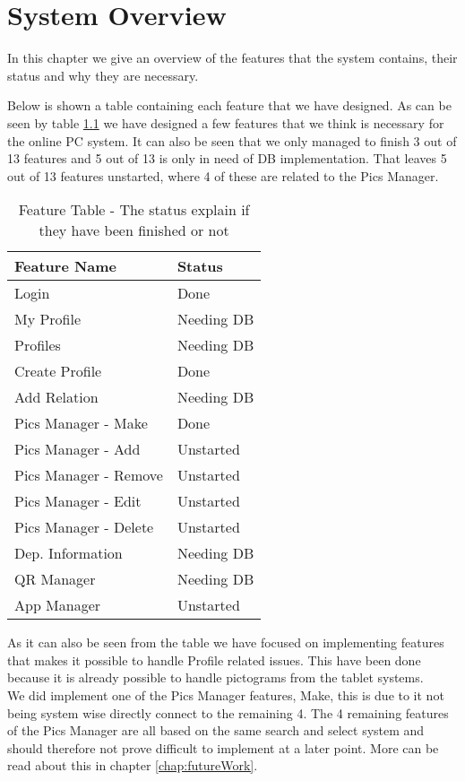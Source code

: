 \chapter{System Overview}
\label{chap:systemOverview}
In this chapter we give an overview of the features that the system contains, their status and why they are necessary.

Below is shown a table containing each feature that we have designed. As can be seen by table \ref{tab:FeatureTable} we have designed a few features that we think is necessary for the online PC system. It can also be seen that we only managed to finish 3 out of 13 features and 5 out of 13 is only in need of DB implementation. That leaves 5 out of 13 features unstarted, where 4 of these are related to the Pics Manager.

\begin{table}[htbp]
	\centering
		\begin{tabular}{|l|l|}
			\hline
			Feature Name & Status\\\hline \hline
			Login & Done \\\hline
			My Profile & Needing DB\\\hline
			Profiles & Needing DB\\\hline
			Create Profile & Done\\\hline
			Add Relation & Needing DB\\\hline
			Pics Manager - Make & Done\\\hline
			Pics Manager - Add & Unstarted\\\hline
			Pics Manager - Remove & Unstarted\\\hline
			Pics Manager - Edit & Unstarted\\\hline
			Pics Manager - Delete & Unstarted\\\hline
			Dep. Information & Needing DB\\\hline
			QR Manager & Needing DB\\\hline
			App Manager & Unstarted\\\hline
		\end{tabular}
	\caption{Feature Table - The status explain if they have been finished or not}
	\label{tab:FeatureTable}
\end{table}

As it can also be seen from the table we have focused on implementing features that makes it possible to handle Profile related issues. This have been done because it is already possible to handle pictograms from the tablet systems.\\
We did implement one of the Pics Manager features, Make, this is due to it not being system wise directly connect to the remaining 4. The 4 remaining features of the Pics Manager are all based on the same search and select system and should therefore not prove difficult to implement at a later point. More can be read about this in chapter \vref{chap:futureWork}.


